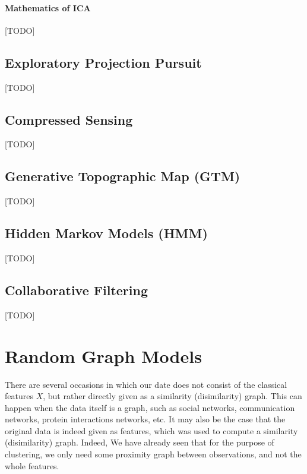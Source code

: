 \paragraph{Mathematics of ICA}
[TODO]








\subsection{Exploratory Projection Pursuit}
\label{sec:exploratpory_ppr}
[TODO]




\subsection{Compressed Sensing}
\label{sec:compressed_sensing}
[TODO]





\subsection{Generative Topographic Map (GTM)}
\label{sec:gtm}
[TODO]





\subsection{Hidden Markov Models (HMM)}
\label{sec:hmm}
[TODO]




\subsection{Collaborative Filtering}
\label{sec:collaborative_filtering}
[TODO]





\section{Random Graph Models}
\label{sec:random_graphs}

There are several occasions in which our date does not consist of the classical features $X$, but rather directly given as a similarity (disimilarity) graph. This can happen when the data itself is a graph, such as social networks, communication networks, protein interactions networks, etc. It may also be the case that the original data is indeed given as features, which was used to compute a similarity (disimilarity) graph. Indeed, We have already seen that for the purpose of clustering, we only need some proximity graph between observations, and not the whole features. 

